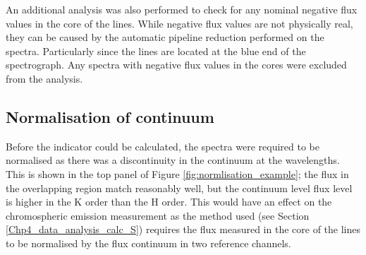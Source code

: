 An additional analysis was also performed to check for any nominal negative flux values in the core of the \caII lines. While negative flux values are not physically real, they can be caused by the automatic pipeline reduction performed on the spectra. Particularly since the \caII lines are located at the blue end of the spectrograph. Any spectra with negative flux values in the \caII cores were excluded from the analysis.

\subsection{Normalisation of continuum}
\label{Chp4_data_analysis_normalise_cont}
Before the \Rprime indicator could be calculated, the spectra were required to be normalised as there was a discontinuity in the continuum at the \caII wavelengths. This is shown in the top panel of Figure \ref{fig:normlisation_example}; the flux in the overlapping region match reasonably well, but the continuum level flux level is higher in the K order than the H order. This would have an effect on the chromospheric emission measurement as the method used (see Section \ref{Chp4_data_analysis_calc_S}) requires the flux measured in the core of the \caII lines to be normalised by the flux continuum in two reference channels.

